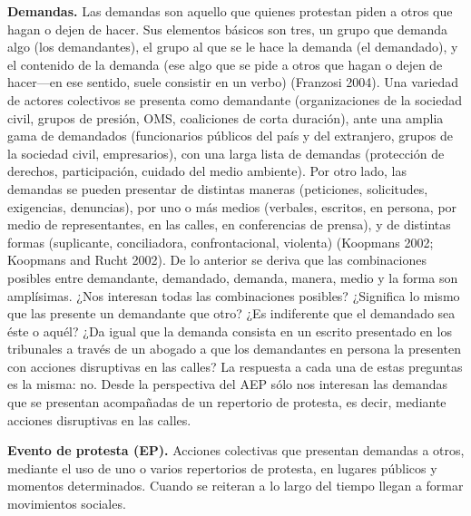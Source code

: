 \documentclass[letterpaper, 11pt]{book}
\theoremstyle{definition}
\theoremstyle{remark}
\begin{document}
{{{{{\textbf{Demandas.} \small{Las demandas son aquello que quienes protestan piden a otros que hagan o dejen de hacer.
Sus elementos básicos son tres, un grupo que demanda algo (los demandantes), el grupo al que se le hace la demanda (el demandado), y el contenido de la demanda (ese algo que se pide a otros que hagan o dejen de hacer—en ese sentido, suele consistir en un verbo) (Franzosi 2004).
Una variedad de actores colectivos se presenta como demandante (organizaciones de la sociedad civil, grupos de presión, OMS, coaliciones de corta duración), ante una amplia gama de demandados (funcionarios públicos del país y del extranjero, grupos de la sociedad civil, empresarios), con una larga lista de demandas (protección de derechos, participación, cuidado del medio ambiente).
Por otro lado, las demandas se pueden presentar de distintas maneras (peticiones, solicitudes, exigencias, denuncias), por uno o más medios (verbales, escritos, en persona, por medio de representantes, en las calles, en conferencias de prensa), y de distintas formas (suplicante, conciliadora, confrontacional, violenta) (Koopmans 2002; Koopmans and Rucht 2002).
De lo anterior se deriva que las combinaciones posibles entre demandante, demandado, demanda, manera, medio y la forma son amplísimas.
¿Nos interesan todas las combinaciones posibles? ¿Significa lo mismo que las presente un demandante que otro? ¿Es indiferente que el demandado sea éste o aquél? ¿Da igual que la demanda consista en un escrito presentado en los tribunales a través de un abogado a que los demandantes en persona la presenten con acciones disruptivas en las calles? La respuesta a cada una de estas preguntas es la misma: no.
Desde la perspectiva del AEP sólo nos interesan las demandas que se presentan acompañadas de un repertorio de protesta, es decir, mediante acciones disruptivas en las calles.}\vspace{1em}


{\textbf{Evento de protesta (EP).} \small{Acciones colectivas que presentan demandas a otros, mediante el uso de uno o varios repertorios de protesta, en lugares públicos y momentos determinados.
Cuando se reiteran a lo largo del tiempo llegan a formar movimientos sociales.}\vspace{1em}


}}}}}}
\end{document}
